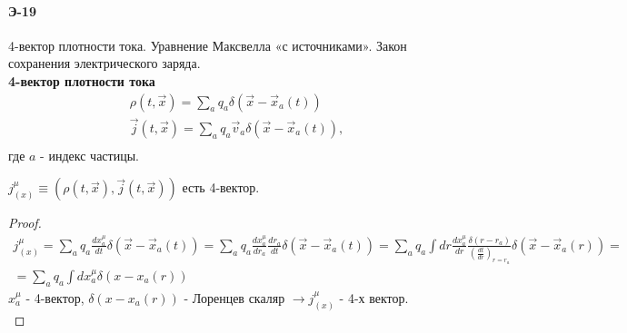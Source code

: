 


 \paragraph{Э-19}
4-вектор плотности тока. Уравнение Максвелла «с источниками». Закон сохранения электрического заряда.\\

\textbf{4-вектор плотности тока}\\
\begin{gather*}
\rho(t, \vec x) = \sum_a q_a \delta(\vec x - \vec x_a(t))\\
\vec j(t, \vec x) = \sum_a q_a \vec v_a \delta(\vec x - \vec x_a(t)),\\
\end{gather*}
где $a$ - индекс частицы.
\begin{statement}
$j^\mu_{(x)}\equiv \left(\rho(t, \vec x), \vec j(t, \vec x) \right)$ есть 4-вектор.
\end{statement}
\begin{proof}
\begin{gather*}
j^\mu_{(x)} = \sum_a q_a \frac{dx_a^\mu}{dt} \delta(\vec x - \vec x_a(t)) = \sum_a q_a \frac{dx_a^\mu}{dr_a} \frac{dr_a}{dt}\delta(\vec x - \vec x_a(t)) = \sum_a q_a \int dr \frac{dx_a^\mu}{dr}\frac{\delta (r - r_a)}{\left(\frac{dt}{dr}\right)_{r=r_a}}\delta(\vec x - \vec x_a(r)) = \\
= \sum_a q_a \int dx_a^\mu \delta(x - x_a(r))
\end{gather*}
$x^\mu_a$ - 4-вектор, $\delta(x - x_a(r))$ - Лоренцев скаляр $\rightarrow j^\mu_{(x)}$ - 4-х вектор.\\
\end{proof}

